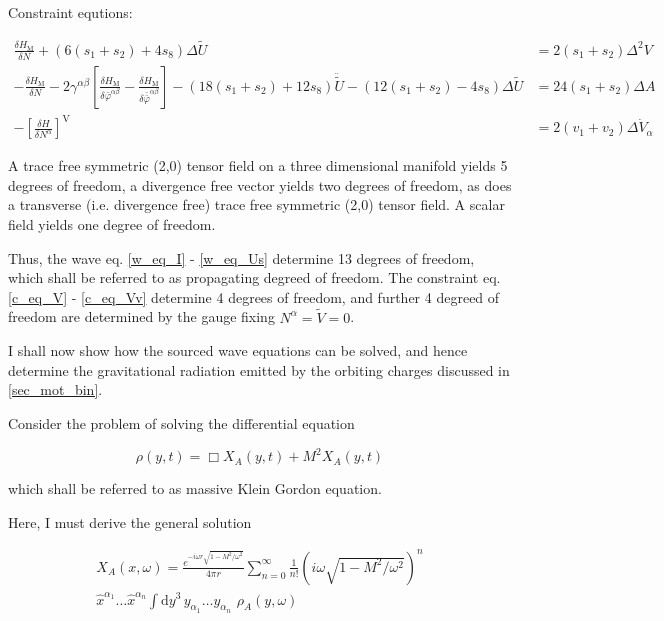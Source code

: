 \documentclass[11pt]{article}
\begin{document}
\begin{landscape}
Constraint equtions:

\begin{align}
	\frac{\delta H_{\text{M}}}{\delta N}
	+
	\left( 
		6 \left( s_1 + s_2 \right) + 4 s_8
	\right)
	\Delta \tilde{U}
	&=
	2 \left( s_1 + s_2 \right) \Delta^2 V
	\label{c_eq_V}
	\\
	- \frac{\delta H_{\text{M}}}{\delta N}
	- 2 \gamma^{\alpha \beta}
	\left[ 
		\frac{
			\delta H_{\text{M}}
		}{
			\delta \bar{\varphi}^{\alpha \beta}
		}
		-
		\frac{
			\delta H_{\text{M}}
		}{
			\delta \bar{\bar{\varphi}}^{\alpha \beta}
		}
	\right]
	-
	\left(
	18 \left( s_1  + s_2 \right) +  12 s_8
	\right) \ddot{\tilde{U}}
	-
	\left(
	12 \left( s_1  + s_2 \right) - 4 s_8 
	\right)
	\Delta \tilde{U}
	&=
	24 \left( s_1 + s_2 \right) \Delta A
	\label{c_eq_A}
	\\
	-
	\left[
	\frac{\delta H}{\delta N^\alpha}
	\right]^{\text{V}}
	&=
	2 \left( v_1 + v_2 \right) \Delta \dot{V}_\alpha
	\label{c_eq_Vv}
\end{align}
	
\end{landscape}

A trace free symmetric (2,0) tensor field on a three dimensional manifold yields 5 degrees of freedom, a divergence free vector yields two degrees of freedom, as does a transverse (i.e. divergence free) trace free symmetric (2,0) tensor field. A scalar field yields one degree of freedom.

Thus, the wave eq. \ref{w_eq_I} - \ref{w_eq_Us} determine 13 degrees of freedom, which shall be referred to as propagating degreed of freedom. The constraint eq. \ref{c_eq_V} - \ref{c_eq_Vv} determine 4 degrees of freedom, and further 4 degreed of freedom are determined by the gauge fixing $N^\alpha = \tilde{V} = 0$. 

I shall now show how the sourced wave equations can be solved, and hence determine the gravitational radiation emitted by the orbiting charges discussed in \ref{sec_mot_bin}.

Consider the problem of solving the differential equation

\begin{equation}
	\rho \left(y, t \right) = \Box X_A \left(y, t \right) + M^2 X_A \left(y, t \right)
\end{equation}

which shall be referred to as massive Klein Gordon equation.

Here, I must derive the general solution

\begin{multline} \label{gen_sol}
	X_A \left( x, \omega \right)
	 = \frac{e^{- i \omega r\sqrt{1 - M^2 / \omega^2}}}{4 \pi r }
	\sum_{n = 0}^\infty
	\frac{1}{n!} 
	\left( 
		i \omega \sqrt{1 - M^2 / \omega^2}
	\right)^n
	\\
	\hat x^{\alpha_1} \dots \hat x^{\alpha_n}
	\int \mathrm{d }y^3 \, y_{\alpha_1}  \dots y_{\alpha_n}\,\,
	\rho_A \left( y, \omega \right)
\end{multline}
\end{document}
